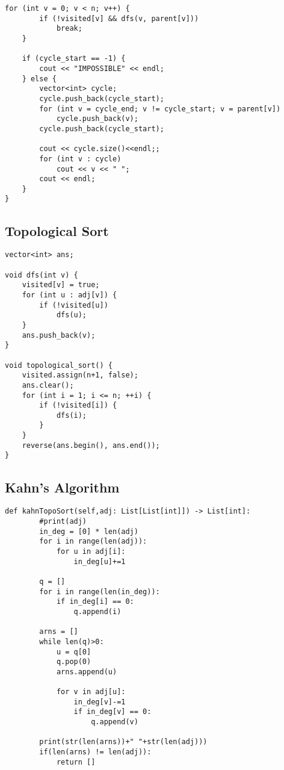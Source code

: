 \documentclass[10pt]{article}
\begin{document}
\begin{multicols*}{2}
\begin{lstlisting}[style=compactcpp]
    for (int v = 0; v < n; v++) {
        if (!visited[v] && dfs(v, parent[v]))
            break;
    }
 
    if (cycle_start == -1) {
        cout << "IMPOSSIBLE" << endl;
    } else {
        vector<int> cycle;
        cycle.push_back(cycle_start);
        for (int v = cycle_end; v != cycle_start; v = parent[v])
            cycle.push_back(v);
        cycle.push_back(cycle_start);
 
        cout << cycle.size()<<endl;;
        for (int v : cycle)
            cout << v << " ";
        cout << endl;
    }
}
\end{lstlisting}

\subsection{Topological Sort}

\begin{lstlisting}[style=compactcpp]
vector<int> ans;
 
void dfs(int v) {
    visited[v] = true;
    for (int u : adj[v]) {
        if (!visited[u])
            dfs(u);
    }
    ans.push_back(v);
}
 
void topological_sort() {
    visited.assign(n+1, false);
    ans.clear();
    for (int i = 1; i <= n; ++i) {
        if (!visited[i]) {
            dfs(i);
        }
    }
    reverse(ans.begin(), ans.end());
}
\end{lstlisting}

\subsection{Kahn's Algorithm}

\begin{lstlisting}[style=compactcpp]
def kahnTopoSort(self,adj: List[List[int]]) -> List[int]:
        #print(adj)
        in_deg = [0] * len(adj)
        for i in range(len(adj)):
            for u in adj[i]:
                in_deg[u]+=1
        
        q = []
        for i in range(len(in_deg)):
            if in_deg[i] == 0:
                q.append(i)

        arns = []
        while len(q)>0:
            u = q[0]
            q.pop(0)
            arns.append(u)

            for v in adj[u]:
                in_deg[v]-=1
                if in_deg[v] == 0:
                    q.append(v)

        print(str(len(arns))+" "+str(len(adj)))
        if(len(arns) != len(adj)): 
            return []


\end{lstlisting}
\end{multicols*}
\end{document}
